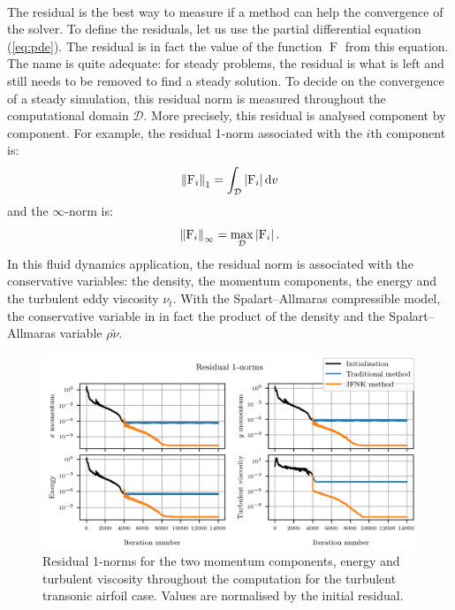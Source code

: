         \paragraph{}
        The residual is the best way to measure if a method can help the convergence of the solver.
        To define the residuals, let us use the partial differential equation (\ref{eq:pde}).
        The residual is in fact the value of the function $\operatorname{F}$ from this equation.
        The name is quite adequate: for steady problems, the residual is what is left and still needs to be removed to find a steady solution.
        To decide on the convergence of a steady simulation, this residual norm is measured throughout the computational domain $\mathcal{D}$.
        More precisely, this residual is analysed component by component.
        For example, the residual 1-norm associated with the $i$th component is:
        \begin{equation}
          \norm[1]{\operatorname{F}_i} = \int_\mathcal{D} \left| \operatorname{F}_i \right| \mathrm{d}v
        \end{equation}
        and the $\infty$-norm is:
        \begin{equation}
          \norm[\infty]{\operatorname{F}_i} = \max_\mathcal{D} \left| \operatorname{F}_i \right| .
        \end{equation}
        In this fluid dynamics application, the residual norm is associated with the conservative variables: the density, the momentum components, the energy and the turbulent eddy viscosity $\nu_t$.
        With the Spalart--Allmaras compressible model, the conservative variable in in fact the product of the density and the Spalart--Allmaras variable $\rho \tilde{\nu}$.

        \begin{figure}
          \centering
          \includegraphics{figures/rae_residuals.png}
          \caption{Residual 1-norms for the two momentum components, energy and turbulent viscosity throughout the computation for the turbulent transonic airfoil case.
          Values are normalised by the initial residual.}
          \label{fig:rae_residuals}
        \end{figure}

